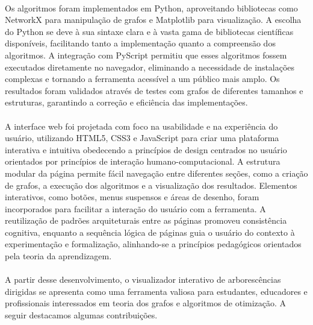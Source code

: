 \documentclass[12pt,a4paper]{article}
\begin{document}
\paragraph{}
Os algoritmos foram implementados em Python, aproveitando bibliotecas como NetworkX para manipulação de grafos e Matplotlib para visualização. A escolha do Python se deve à sua sintaxe clara e à vasta gama de bibliotecas científicas disponíveis, facilitando tanto a implementação quanto a compreensão dos algoritmos. A integração com PyScript permitiu que esses algoritmos fossem executados diretamente no navegador, eliminando a necessidade de instalações complexas e tornando a ferramenta acessível a um público mais amplo. Os resultados foram validados através de testes com grafos de diferentes tamanhos e estruturas, garantindo a correção e eficiência das implementações.

\paragraph{}
A interface web foi projetada com foco na usabilidade e na experiência do usuário, utilizando HTML5, CSS3 e JavaScript para criar uma plataforma interativa e intuitiva obedecendo a princípios de design centrados no usuário orientados por princípios de interação humano-computacional. A estrutura modular da página permite fácil navegação entre diferentes seções, como a criação de grafos, a execução dos algoritmos e a visualização dos resultados. Elementos interativos, como botões, menus suspensos e áreas de desenho, foram incorporados para facilitar a interação do usuário com a ferramenta. A reutilização de padrões arquiteturais entre as páginas promoveu consistência cognitiva, enquanto a sequência lógica de páginas guia o usuário do contexto à experimentação e formalização, alinhando-se a princípios pedagógicos orientados pela teoria da aprendizagem.

\paragraph{}
A partir desse desenvolvimento, o visualizador interativo de arborescências dirigidas se apresenta como uma ferramenta valiosa para estudantes, educadores e profissionais interessados em teoria dos grafos e algoritmos de otimização. A seguir destacamos algumas contribuições.
\end{document}
